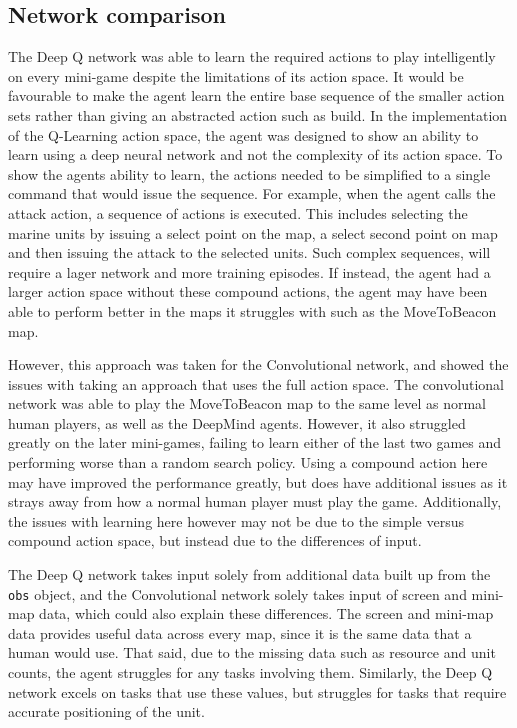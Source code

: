 \subsection{Network comparison}

The Deep Q network was able to learn the required actions to play intelligently
on every mini-game despite the limitations of its action space. It would be
favourable to make the agent learn the entire base sequence of the smaller
action sets rather than giving an abstracted action such as build. In the
implementation of the Q-Learning action space, the agent was designed to show an
ability to learn using a deep neural network and not the complexity of its
action space. To show the agents ability to learn, the actions needed to be
simplified to a single command that would issue the sequence. For example, when
the agent calls the attack action, a sequence of actions is executed. This
includes selecting the marine units by issuing a select point on the map, a
select second point on map and then issuing the attack to the selected units.
Such complex sequences, will require a lager network and more training episodes.
If instead, the agent had a larger action space without these compound actions,
the agent may have been able to perform better in the maps it struggles with
such as the MoveToBeacon map.

However, this approach was taken for the Convolutional network, and showed the
issues with taking an approach that uses the full action space. The
convolutional network was able to play the MoveToBeacon map to the same level as
normal human players, as well as the DeepMind agents. However, it also struggled
greatly on the later mini-games, failing to learn either of the last two games
and performing worse than a random search policy. Using a compound action here
may have improved the performance greatly, but does have additional issues as it
strays away from how a normal human player must play the game. Additionally,
the issues with learning here however may not be due to the simple versus
compound action space, but instead due to the differences of input.

The Deep Q network takes input solely from additional data built up from the
\texttt{obs} object, and the Convolutional network solely takes input of screen
and mini-map data, which could also explain these differences. The screen and
mini-map data provides useful data across every map, since it is the same data
that a human would use. That said, due to the missing data such as resource and
unit counts, the agent struggles for any tasks involving them. Similarly, the
Deep Q network excels on tasks that use these values, but struggles for tasks
that require accurate positioning of the unit.

